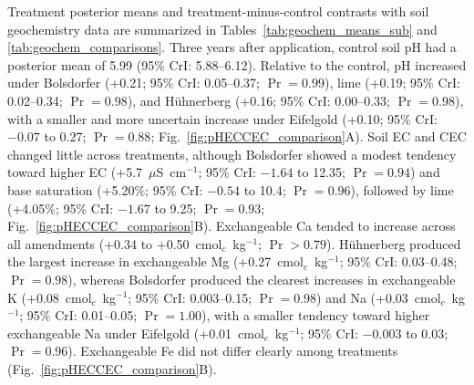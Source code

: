 \documentclass[preprint,12pt]{elsarticle}
\begin{document}
Treatment posterior means and treatment-minus-control contrasts with soil geochemistry data are summarized in Tables~\ref{tab:geochem_means_sub} and \ref{tab:geochem_comparisons}. Three years after application, control soil pH had a posterior mean of 5.99 (95\% CrI: 5.88--6.12). Relative to the control, pH increased under Bolsdorfer (+0.21; 95\% CrI: 0.05--0.37; $\Pr = 0.99$), lime (+0.19; 95\% CrI: 0.02--0.34; $\Pr = 0.98$), and H\"uhnerberg (+0.16; 95\% CrI: 0.00--0.33; $\Pr = 0.98$), with a smaller and more uncertain increase under Eifelgold (+0.10; 95\% CrI: $-0.07$ to 0.27; $\Pr = 0.88$; Fig.~\ref{fig:pHECCEC_comparison}A). Soil EC and CEC changed little across treatments, although Bolsdorfer showed a modest tendency toward higher EC (+5.7~$\mu$S~cm$^{-1}$; 95\% CrI: $-1.64$ to 12.35; $\Pr = 0.94$) and base saturation (+5.20\%; 95\% CrI: $-0.54$ to 10.4; $\Pr = 0.96$), followed by lime (+4.05\%; 95\% CrI: $-1.67$ to 9.25; $\Pr = 0.93$; Fig.~\ref{fig:pHECCEC_comparison}B). Exchangeable Ca tended to increase across all amendments (+0.34 to +0.50~cmol$_c$~kg$^{-1}$; $\Pr > 0.79$). H\"uhnerberg produced the largest increase in exchangeable Mg (+0.27~cmol$_c$~kg$^{-1}$; 95\% CrI: 0.03--0.48; $\Pr = 0.98$), whereas Bolsdorfer produced the clearest increases in exchangeable K (+0.08~cmol$_c$~kg$^{-1}$; 95\% CrI: 0.003--0.15; $\Pr = 0.98$) and Na (+0.03~cmol$_c$~kg$^{-1}$; 95\% CrI: 0.01--0.05; $\Pr = 1.00$), with a smaller tendency toward higher exchangeable Na under Eifelgold (+0.01~cmol$_c$~kg$^{-1}$; 95\% CrI: $-0.003$ to 0.03; $\Pr = 0.96$). Exchangeable Fe did not differ clearly among treatments (Fig.~\ref{fig:pHECCEC_comparison}B).
\end{document}
